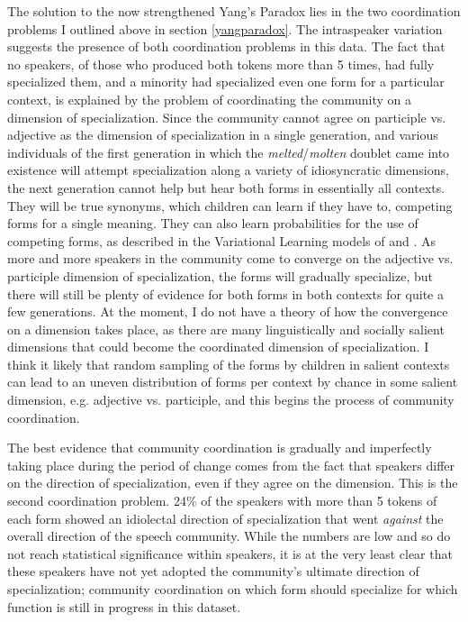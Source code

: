 \documentclass{artikel3}
\begin{document}
The solution to the now strengthened Yang's Paradox lies in the two coordination problems I outlined above in section \ref{yangparadox}. The intraspeaker variation suggests the presence of both coordination problems in this data. The fact that no speakers, of those who produced both tokens more than 5 times, had fully specialized them, and a minority had specialized even one form for a particular context, is explained by the problem of coordinating the community on a dimension of specialization. Since the community cannot agree on participle vs. adjective as the dimension of specialization in a single generation, and various individuals of the first generation in which the \textsl{melted}/\textsl{molten} doublet came into existence will attempt specialization along a variety of idiosyncratic dimensions, the next generation cannot help but hear both forms in essentially all contexts. They will be true synonyms, which children can learn if they have to, competing forms for a single meaning. They can also learn probabilities for the use of competing forms, as described in the Variational Learning models of \citet{yang2000} and \citet{yang2002}. As more and more speakers in the community come to converge on the adjective vs. participle dimension of specialization, the forms will gradually specialize, but there will still be plenty of evidence for both forms in both contexts for quite a few generations. At the moment, I do not have a theory of how the convergence on a dimension takes place, as there are many linguistically and socially salient dimensions that could become the coordinated dimension of specialization. I think it likely that random sampling of the forms by children in salient contexts can lead to an uneven distribution of forms per context by chance in some salient dimension, e.g. adjective vs. participle, and this begins the process of community coordination. 

The best evidence that community coordination is gradually and imperfectly taking place during the period of change comes from the fact that speakers differ on the direction of specialization, even if they agree on the dimension. This is the second coordination problem. 24\% of the speakers with more than 5 tokens of each form showed an idiolectal direction of specialization that went \textsl{against} the overall direction of the speech community. While the numbers are low and so do not reach statistical significance within speakers, it is at the very least clear that these speakers have not yet adopted the community's ultimate direction of specialization; community coordination on which form should specialize for which function is still in progress in this dataset.
\end{document}
